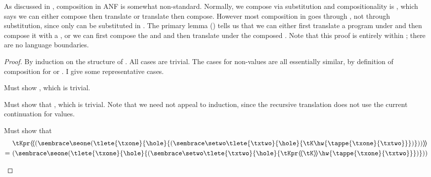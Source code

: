 {
\allowdisplaybreaks %
As discussed in , composition in ANF is somewhat non-standard.
Normally, we compose via substitution and compositionality
is \im{\anfh{\subst{\se}{\sepr}{\sx}} \equiv
  \subst{\anfh{\se}}{\anfh{\sepr}}{\tx}}, which says we can either compose
then translate or translate then compose.
However most composition in  goes through , not
through substitution, since only  can be substituted in
.
The primary  lemma () tells
us that we can either first translate a program \im{\se} under
 \im{\tK} and then compose it with a 
\im{\tKpr}, or we can first compose the  \im{\tK} and
\im{\tKpr} and then translate \im{\se} under the composed .
Note that this proof is entirely within \tlang; there are no language boundaries.
\begin{lemma}[Compositionality]
  \label{lem:anf:comp-stack}
  \im{\tKpr\hhw{\anf{\se}{\tK}} = \anf{\se}{\tKpr\hhw{\tK}}}
\end{lemma}
\begin{proof}
  By induction on the structure of \im{\se}.
  All  cases are trivial.
  The cases for non-values are all essentially similar, by definition of
  composition for  or .
  I give some representative cases.
  \begin{proofcases}
    \item \im{\se = \sx}

      Must show \im{\tKpr\hhw{\tK\hw{\tx}} = \tKpr\hhw{\tK\hw{\tx}}}, which is trivial.
    \item \im{\se = \spity{\sx}{\sA}{\sB}}

      Must show that \im{\tKpr\hhw{\tK\hw{\tpity{\tx}{\anfh{\sA}}{\anfh{\sB}}}} =
        \tKpr\hhw{\tK{\hw{\tpity{\tx}{\anfh{\sA}}{\anfh{\sB}}}}}}, which is trivial.
      Note that we need not appeal to induction, since the recursive
      translation does not use the current continuation for values.
    \item \im{\se = \sappe{\seone}{\setwo}}
      Must show that
      \begin{align}
        & \tKpr\hhw{(\anf{\seone}{(\tlete{\txone}{\hole}{(\anf{\setwo}{\tlete{\txtwo}{\hole}{\tK\hw{\tappe{\txone}{\txtwo}}}})})})} \nonumber \\
        =~& (\anf{\seone}{(\tlete{\txone}{\hole}{(\anf{\setwo}{\tlete{\txtwo}{\hole}{\tKpr\hhw\tK\hw{\tappe{\txone}{\txtwo}}}})})}) \nonumber
      \end{align}


\end{proofcases}
\end{proof}}
